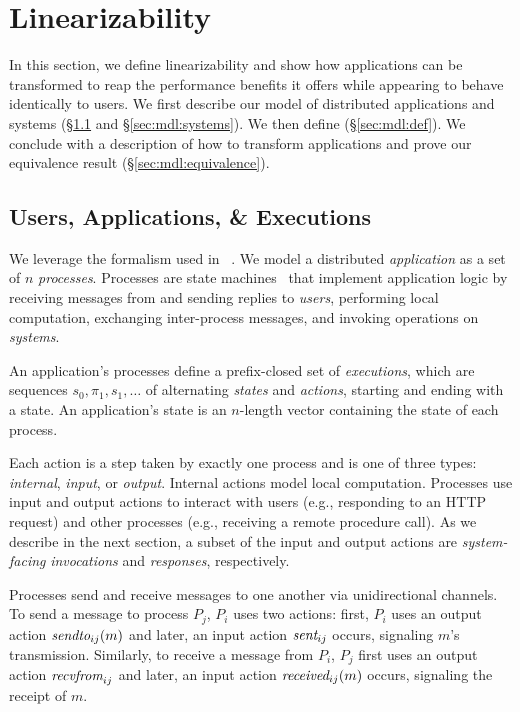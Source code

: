 \section{\Multidispatch{} Linearizability}
\label{sec:mdl}

In this section, we define \multidispatch{} linearizability and show how
applications can be transformed to reap the performance benefits it offers while appearing to behave identically to users.
We first describe our model of distributed applications and systems
(\S\ref{sec:mdl:applications} and \S\ref{sec:mdl:systems}).
We then define \MDL{} (\S\ref{sec:mdl:def}). We conclude with a description
of how to transform applications and prove our equivalence result
(\S\ref{sec:mdl:equivalence}).

\subsection{Users, Applications, \& Executions}
\label{sec:mdl:applications}

We leverage the formalism used in \citeauthor{helt2021rss}~\cite{helt2021rss}. We model a
distributed \textit{application} as a set of $n$ \textit{processes}.
Processes are state machines~\cite{lynch1987ioa,lynch1996da}
that implement application logic by receiving messages from and sending replies
to \textit{users}, performing local computation, exchanging inter-process
messages, and invoking operations on \textit{systems}.

An application's processes define a prefix-closed set of \textit{executions},
which are sequences $s_0,\pi_1,s_1,\ldots$ of alternating \textit{states} and
\textit{actions}, starting and ending with a state. An application's state
is an $n$-length vector containing the state of each process.

Each action is a step taken by exactly one process and is one of three types:
\textit{internal}, \textit{input}, or \textit{output}. Internal actions model
local computation. Processes use input and output actions to interact with
users (e.g., responding to an HTTP request) and other
processes (e.g., receiving a remote procedure call).
As we describe in the next section, a subset of the input and output actions
are \textit{system-facing} \textit{invocations} and \textit{responses}, 
respectively.

Processes send and receive messages to one another via unidirectional
channels. To send a message to process $P_j$, $P_i$ uses two
actions: first, $P_i$ uses an output action $\operatorname*{\operatorname*{\textit{sendto}}}_{ij}(m)$
and later, an input action $\operatorname*{\textit{sent}}_{ij}$ occurs, signaling $m$'s 
transmission. Similarly, to receive a message from $P_i$, $P_j$ first
uses an output action $\operatorname*{\textit{recvfrom}}_{ij}$ and later, an input action
$\operatorname*{\textit{received}}_{ij}(m)$ occurs, signaling the receipt of $m$.

